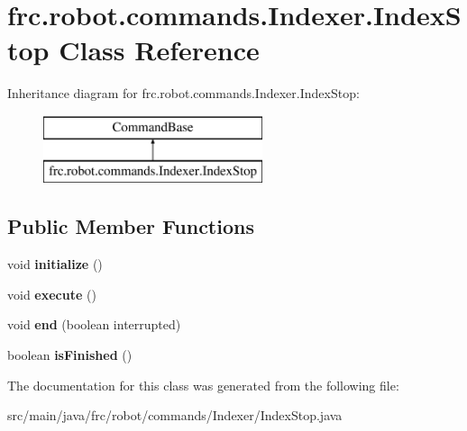 \hypertarget{classfrc_1_1robot_1_1commands_1_1_indexer_1_1_index_stop}{}\section{frc.\+robot.\+commands.\+Indexer.\+Index\+Stop Class Reference}
\label{classfrc_1_1robot_1_1commands_1_1_indexer_1_1_index_stop}
Inheritance diagram for frc.\+robot.\+commands.\+Indexer.\+Index\+Stop\+:\begin{figure}[H]
\begin{center}
\leavevmode
\includegraphics[height=2.000000cm]{classfrc_1_1robot_1_1commands_1_1_indexer_1_1_index_stop}
\end{center}
\end{figure}
\subsection*{Public Member Functions}
\begin{DoxyCompactItemize}
\item 
\mbox{\label{classfrc_1_1robot_1_1commands_1_1_indexer_1_1_index_stop_a48f8386cef377428f6e86de2774856d2}} 
void {\bfseries initialize} ()
\item 
\mbox{\label{classfrc_1_1robot_1_1commands_1_1_indexer_1_1_index_stop_a527c5119c1961d8fbdb77b2435778cbd}} 
void {\bfseries execute} ()
\item 
\mbox{\label{classfrc_1_1robot_1_1commands_1_1_indexer_1_1_index_stop_a0c3932ad4455e78ba0f3dd57a1a647af}} 
void {\bfseries end} (boolean interrupted)
\item 
\mbox{\label{classfrc_1_1robot_1_1commands_1_1_indexer_1_1_index_stop_a2eed64c5bafaf747477f96ecdd6d1acc}} 
boolean {\bfseries is\+Finished} ()
\end{DoxyCompactItemize}


The documentation for this class was generated from the following file\+:\begin{DoxyCompactItemize}
\item 
src/main/java/frc/robot/commands/\+Indexer/Index\+Stop.\+java\end{DoxyCompactItemize}

